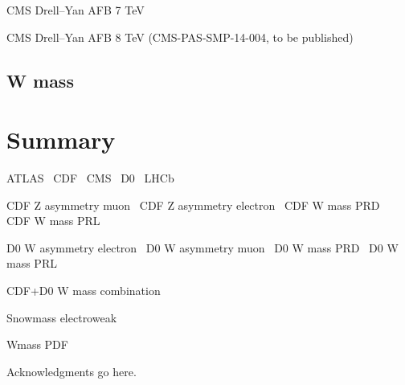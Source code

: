 \documentclass[12pt]{iopart}
\begin{document}
CMS Drell--Yan AFB 7 TeV~\cite{Chatrchyan:2012dc}

CMS Drell--Yan AFB 8 TeV (CMS-PAS-SMP-14-004, to be published)

\subsection{W mass}


\section{Summary}


ATLAS~\cite{Aad:2008zzm}
CDF~\cite{Abulencia:2005ix}
CMS~\cite{CMSdetector}
D0~\cite{Abazov:2005pn}
LHCb~\cite{Alves:2008zz}

CDF Z asymmetry muon~\cite{Aaltonen:2014loa}
CDF Z asymmetry electron~\cite{Aaltonen:2013wcp}
CDF W mass PRD~\cite{Aaltonen:2013vwa}
CDF W mass PRL~\cite{Aaltonen:2012bp}

D0 W asymmetry electron~\cite{Abazov:2013dsa}
D0 W asymmetry muon~\cite{Abazov:2013rja}
D0 W mass PRD~\cite{D0:2013jba}
D0 W mass PRL~\cite{Abazov:2012bv}

CDF+D0 W mass combination~\cite{Aaltonen:2013iut}

Snowmass electroweak~\cite{Baak:2013fwa}

Wmass PDF~\cite{Bozzi:2011ww}

\ack
Acknowledgments go here. 



\end{document}
